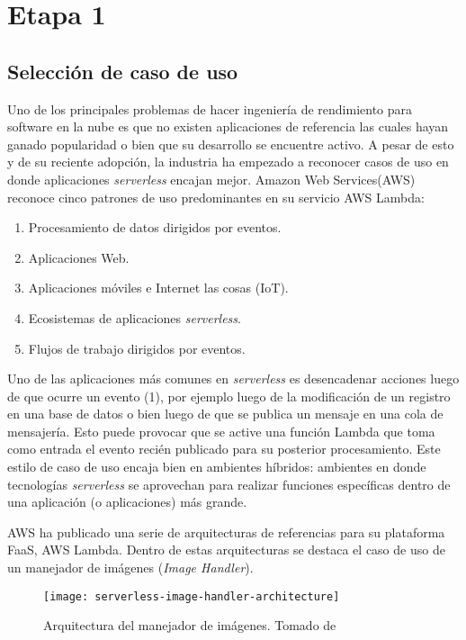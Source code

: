 \section{Etapa 1}
\subsection{Selección de caso de uso}
Uno de los principales problemas de hacer ingeniería de rendimiento para software en la nube es que no existen aplicaciones de referencia las cuales hayan ganado popularidad o bien que su desarrollo se encuentre activo. A pesar de esto y de su reciente adopción, la industria ha empezado a reconocer casos de uso en donde aplicaciones \emph{serverless} encajan mejor. Amazon Web Services(AWS)\cite{serverless-architecture-patterns} reconoce cinco patrones de uso predominantes en su servicio AWS Lambda:
\begin{enumerate}
    \item Procesamiento de datos dirigidos por eventos.
    \item Aplicaciones Web.
    \item Aplicaciones móviles e Internet las cosas (IoT).
    \item Ecosistemas de aplicaciones \emph{serverless}.
    \item Flujos de trabajo dirigidos por eventos.
\end{enumerate}
 
Uno de las aplicaciones más comunes en \emph{serverless} es desencadenar acciones luego de que ocurre un evento (1), por ejemplo luego de la modificación de un registro en una base de datos o bien luego de que se publica un mensaje en una cola de mensajería. Esto puede provocar que se active una función Lambda que toma como entrada el evento recién publicado para su posterior procesamiento. Este estilo de caso de uso encaja bien en ambientes híbridos: ambientes en donde tecnologías \emph{serverless} se aprovechan para realizar funciones específicas dentro de una aplicación (o aplicaciones) más grande.

AWS ha publicado una serie de arquitecturas de referencias\cite{aws-lambda-ref-arch} para su plataforma FaaS, AWS Lambda. Dentro de estas arquitecturas se destaca el caso de uso de un manejador de imágenes (\emph{Image Handler})\cite{aws-lambda-image-handler}. 

\begin{figure}[h]
  \centering
  \texttt{[image: serverless-image-handler-architecture]}
  \caption[Arquitectura del manejador de imágenes]{Arquitectura del manejador de imágenes. Tomado de \protect\cite{aws-lambda-image-handler}}
  \label{fig:serverless-image-handler-architecture}
\end{figure}


